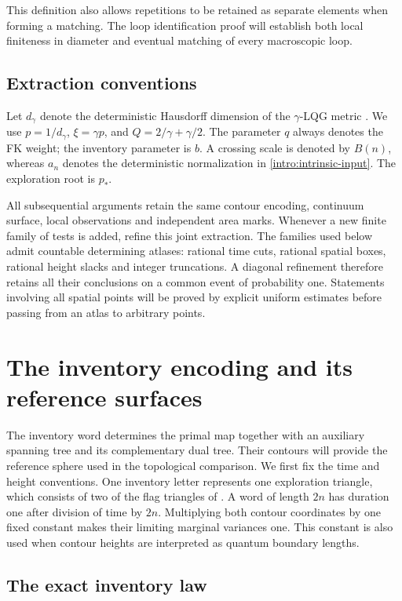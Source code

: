 \documentclass[11pt]{article}
\numberwithin{equation}{section}
\theoremstyle{definition}
\theoremstyle{remark}
\newcommand{\1}{\mathbf 1}
\begin{document}
This definition also allows repetitions to be retained as separate
elements when forming a matching. The loop identification proof will
establish both local finiteness in diameter and eventual matching of
every macroscopic loop.

\subsection{Extraction conventions}

Let $d_\gamma$ denote the deterministic Hausdorff dimension of the
$\gamma$-LQG metric \citep{GwynneMillerMetric}. We use
$p=1/d_\gamma$, $\xi=\gamma p$, and
$Q=2/\gamma+\gamma/2$. The parameter $q$ always denotes the FK
weight; the inventory parameter is $b$. A crossing scale is denoted
by $B(n)$, whereas $a_n$ denotes the deterministic normalization in
\cref{intro:intrinsic-input}. The exploration root is $p_*$.

All subsequential arguments retain the same contour encoding,
continuum surface, local observations and independent area marks.
Whenever a new finite family of tests is added, refine this joint
extraction. The families used below admit countable determining
atlases: rational time cuts, rational spatial boxes, rational height
slacks and integer truncations. A diagonal refinement therefore
retains all their conclusions on a common event of probability one.
Statements involving all spatial points will be proved by explicit
uniform estimates before passing from an atlas to arbitrary points.

\section{The inventory encoding and its reference surfaces}
\label{enc:section}

The inventory word determines the primal map together with an auxiliary
spanning tree and its complementary dual tree.  Their contours will
provide the reference sphere used in the topological comparison.
We first fix the time and height conventions.  One inventory letter represents
one exploration triangle, which consists of two of the flag triangles
of .  A word of length $2n$ has duration one
after division of time by $2n$.  Multiplying both contour coordinates by one
fixed constant makes their limiting marginal variances one.  This constant is
also used when contour heights are interpreted as quantum boundary lengths.

\subsection{The exact inventory law}
\end{document}
